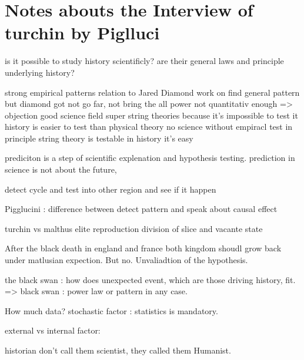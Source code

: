 

\section{Notes abouts the Interview of turchin by Piglluci}
	is it possible to study history scientificly?
	are their general laws and principle underlying history?

	strong empirical patterns relation to Jared Diamond work on find general pattern
but diamond got not go far, not bring the all power not quantitativ enough
=> objection good science field super string theories because it's impossible to test it
	history is easier to test than physical theory
	no science without empiracl test
	in principle string theory is testable
	in history it's easy
					
prediciton is a step of scientific explenation and hypothesis testing.
prediction in science is not about the future,

detect cycle and test into other region and see if it happen

Pigglucini : difference between detect pattern and speak about causal effect

turchin vs malthus
elite reproduction division of slice and vacante state


After the black death in england and france both kingdom shoudl grow back under matlusian expection. But no. Unvaliadtion of the hypothesis.

the black swan : how does unexpected event, which are those driving history, fit. => black swan : power law or pattern in any case.

How much data? stochastic factor : statistics is mandatory.

external vs internal factor:


historian don't call them scientist, they called them Humanist.


